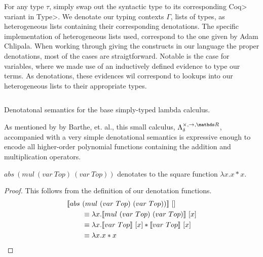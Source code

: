 \documentclass[11pt, final]{article}
\begin{document}
  For any type $\tau$, simply swap out the syntactic type to its corresponding \<Coq> variant in \<Type>.
  We denotate our typing contexts $\Gamma$, lists of types, as heterogeneous lists containing their corresponding denotations.
  The specific implementation of heterogeneous lists used, correspond to the one given by Adam Chlipala\cite{ChlipalaCPDT}.
  When working through giving the constructs in our language the proper denotations, most of the cases are straigtforward.
  Notable is the case for variables, where we made use of an inductively defined evidence to type our terms.
  As denotations, these evidences wil correspond to lookups into our heterogeneous lists to their appropriate types.

  \begin{listing}
    \begin{verbatim}
    \end{verbatim}
    \caption{Denotatonal semantics for the base simply-typed lambda calculus.}
    \label{lst:denotation_base}
  \end{listing}

  As mentioned by by Barthe, et. al.\cite{barthe2020versatility}, this small calculus, $\lambdaBase$, accompanied with a very simple denotational semantics is expressive enough to encode all higher-order polynomial functions containing the addition and multiplication operators.

  \begin{example}[Square]
    $abs\ (mul\ (var\ Top)\ (var\ Top))$ denotates to the square function $\lambda x. x * x$.
    \begin{proof}
      This follows from the definition of our denotation functions.
      \begin{align*}
        \llbracket abs\ &(mul\ (var\ Top)\ (var\ Top)) \rrbracket\ [] \\
          &\equiv \lambda x.
            \llbracket mul\ (var\ Top)\ (var\ Top) \rrbracket\ [x] \\
          &\equiv \lambda x.
            \llbracket var\ Top \rrbracket\ [x] *
              \llbracket var\ Top \rrbracket\ [x] \\
          &\equiv \lambda x. x * x \qedhere
      \end{align*}
    \end{proof}
  \end{example}

\end{document}
